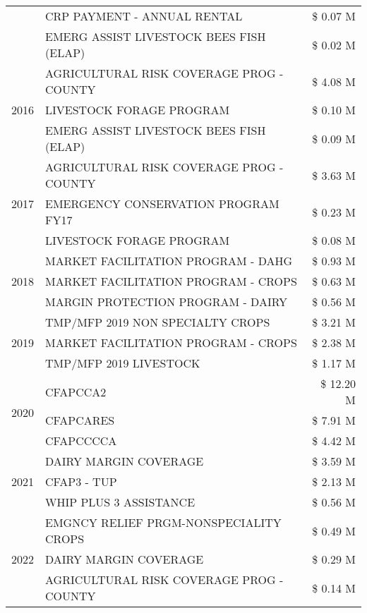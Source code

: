 \begin{tabular}{llr}
 & CRP PAYMENT - ANNUAL RENTAL & \$ 0.07 M \\
 & EMERG ASSIST LIVESTOCK BEES FISH (ELAP) & \$ 0.02 M \\
\cline{1-3}
\multirow[t]{3}{*}{2016} & AGRICULTURAL RISK COVERAGE PROG - COUNTY & \$ 4.08 M \\
 & LIVESTOCK FORAGE PROGRAM & \$ 0.10 M \\
 & EMERG ASSIST LIVESTOCK BEES FISH (ELAP) & \$ 0.09 M \\
\cline{1-3}
\multirow[t]{3}{*}{2017} & AGRICULTURAL RISK COVERAGE PROG - COUNTY & \$ 3.63 M \\
 & EMERGENCY CONSERVATION PROGRAM FY17 & \$ 0.23 M \\
 & LIVESTOCK FORAGE PROGRAM & \$ 0.08 M \\
\cline{1-3}
\multirow[t]{3}{*}{2018} & MARKET FACILITATION PROGRAM - DAHG & \$ 0.93 M \\
 & MARKET FACILITATION PROGRAM - CROPS & \$ 0.63 M \\
 & MARGIN PROTECTION PROGRAM - DAIRY & \$ 0.56 M \\
\cline{1-3}
\multirow[t]{3}{*}{2019} & TMP/MFP 2019 NON SPECIALTY CROPS & \$ 3.21 M \\
 & MARKET FACILITATION PROGRAM - CROPS & \$ 2.38 M \\
 & TMP/MFP 2019 LIVESTOCK & \$ 1.17 M \\
\cline{1-3}
\multirow[t]{3}{*}{2020} & CFAPCCA2 & \$ 12.20 M \\
 & CFAPCARES & \$ 7.91 M \\
 & CFAPCCCCA & \$ 4.42 M \\
\cline{1-3}
\multirow[t]{3}{*}{2021} & DAIRY MARGIN COVERAGE & \$ 3.59 M \\
 & CFAP3 - TUP & \$ 2.13 M \\
 & WHIP PLUS 3 ASSISTANCE & \$ 0.56 M \\
\cline{1-3}
\multirow[t]{3}{*}{2022} & EMGNCY RELIEF PRGM-NONSPECIALITY CROPS & \$ 0.49 M \\
 & DAIRY MARGIN COVERAGE & \$ 0.29 M \\
 & AGRICULTURAL RISK COVERAGE PROG - COUNTY & \$ 0.14 M \\
\cline{1-3}
\bottomrule
\end{tabular}
